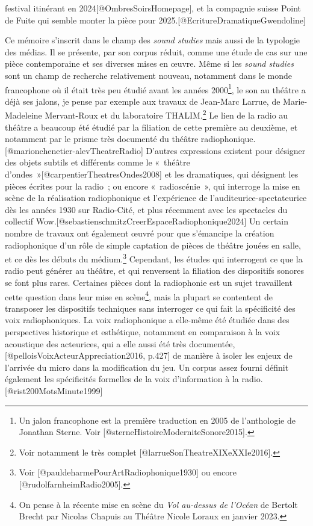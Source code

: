 \documentclass[
]{article}
\begin{document}
festival itinérant en 2024{[}@OmbresSoirsHomepage{]}, et la compagnie suisse Point de Fuite qui semble monter la pièce pour 2025.{[}@EcritureDramatiqueGwendoline{]}

Ce mémoire s'inscrit dans le champ des \emph{sound studies} mais aussi de la typologie des médias. Il se présente, par son corpus réduit, comme une étude de cas sur une pièce contemporaine et ses diverses mises en œuvre. Même si les \emph{sound studies }sont un champ de recherche relativement nouveau, notamment dans le monde francophone où il était très peu étudié avant les années 2000\footnote{Un jalon francophone est la première traduction en 2005 de l'anthologie de Jonathan Sterne. Voir {[}@sterneHistoireModerniteSonore2015{]}.}, le son au théâtre a déjà ses jalons, je pense par exemple aux travaux de Jean-Marc Larrue, de Marie-Madeleine Mervant-Roux et du laboratoire THALIM.\footnote{Voir notamment le très complet {[}@larrueSonTheatreXIXeXXIe2016{]}.} Le lien de la radio au théâtre a beaucoup été étudié par la filiation de cette première au deuxième, et notamment par le prisme très documenté du théâtre radiophonique.{[}@marionchenetier-alevTheatreRadio{]} D'autres expressions existent pour désigner des objets subtils et différents comme le «~théâtre d'ondes~»{[}@carpentierTheatresOndes2008{]} et les dramatiques, qui désignent les pièces écrites pour la radio~; ou encore «~radioscénie~», qui interroge la mise en scène de la réalisation radiophonique et l'expérience de l'auditeurice-spectateurice dès les années 1930 sur Radio-Cité, et plus récemment avec les spectacles du collectif Wow.{[}@sebastienschmitzCreerEspaceRadiophonique2024{]} Un certain nombre de travaux ont également œuvré pour que s'émancipe la création radiophonique d'un rôle de simple captation de pièces de théâtre jouées en salle, et ce dès les débuts du médium.\footnote{Voir {[}@pauldeharmePourArtRadiophonique1930{]} ou encore {[}@rudolfarnheimRadio2005{]}.} Cependant, les études qui interrogent ce que la radio peut générer au théâtre, et qui renversent la filiation des dispositifs sonores se font plus rares. Certaines pièces dont la radiophonie est un sujet travaillent cette question dans leur mise en scène\footnote{On pense à la récente mise en scène du \emph{Vol au-dessus de l'Océan} de Bertolt Brecht par Nicolas Chapuis au Théâtre Nicole Loraux en janvier 2023.}, mais la plupart se contentent de transposer les dispositifs techniques sans interroger ce qui fait la spécificité des voix radiophoniques. La voix radiophonique a elle-même été étudiée dans des perspectives historique et esthétique, notamment en comparaison à la voix acoustique des acteurices, qui a elle aussi été très documentée,{[}@pelloisVoixActeurAppreciation2016, p.427{]} de manière à isoler les enjeux de l'arrivée du micro dans la modification du jeu. Un corpus assez fourni définit également les spécificités formelles de la voix d'information à la radio.{[}@rist200MotsMinute1999{]}
\end{document}

